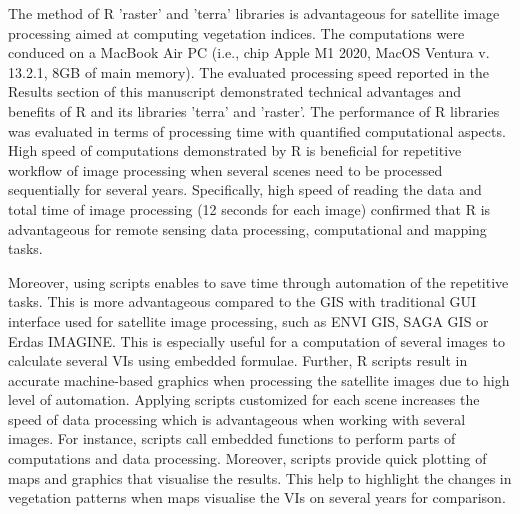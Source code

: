\documentclass[jimaging,article,submit,pdftex,moreauthors]{Definitions/mdpi}
\begin{document}
The method of R 'raster' and 'terra' libraries is advantageous for satellite image processing aimed at computing vegetation indices. The computations were conduced on a MacBook Air PC (i.e., chip Apple M1 2020, MacOS Ventura v. 13.2.1, 8GB of main memory). The evaluated processing speed reported in the Results section of this manuscript demonstrated technical advantages and benefits of R and its libraries 'terra' and 'raster'. The performance of R libraries was evaluated in terms of processing time with quantified computational aspects. High speed of computations demonstrated by R is beneficial for repetitive workflow of image processing when several scenes need to be processed sequentially for several years. Specifically, high speed of reading the data and total time of image processing (12 seconds for each image) confirmed that R is advantageous for remote sensing data processing, computational and mapping tasks.

Moreover, using scripts enables to save time through automation of the repetitive tasks. This is more advantageous compared to the GIS with traditional GUI interface used for satellite image processing, such as ENVI GIS, SAGA GIS or Erdas IMAGINE. This is especially useful for a computation of several images to calculate several VIs using embedded formulae. Further, R scripts result in accurate machine-based graphics when processing the satellite images due to high level of automation. Applying scripts customized for each scene increases the speed of data processing which is advantageous when working with several images. For instance, scripts call embedded functions to perform parts of computations and data processing. Moreover, scripts provide quick plotting of maps and graphics that visualise the results. This help to highlight the changes in vegetation patterns when maps visualise the VIs on several years for comparison. 
\end{document}
